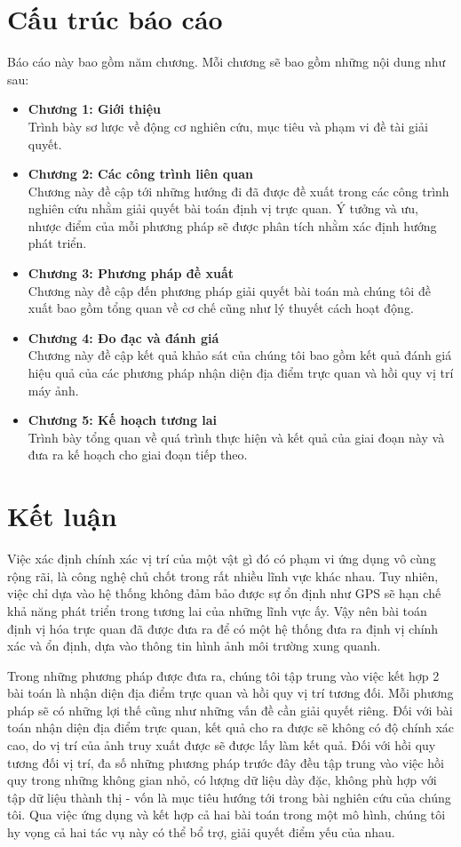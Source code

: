 \section{Cấu trúc báo cáo}
Báo cáo này bao gồm năm chương. Mỗi chương sẽ bao gồm những nội dung như sau:
\begin{itemize}
    \item \textbf{Chương 1: Giới thiệu} \\
          Trình bày sơ lược về động cơ nghiên cứu, mục tiêu và phạm vi đề tài giải quyết.
    \item \textbf{Chương 2: Các công trình liên quan} \\
          Chương này đề cập tới những hướng đi đã được đề xuất trong các công trình nghiên cứu nhằm giải quyết bài toán định vị trực quan. Ý tưởng và ưu, nhược điểm của mỗi phương pháp sẽ được phân tích nhằm xác định hướng phát triển.
    \item \textbf{Chương 3: Phương pháp đề xuất} \\
          Chương này đề cập đến phương pháp giải quyết bài toán mà chúng tôi đề xuất bao gồm tổng quan về cơ chế cũng như lý thuyết cách hoạt động.
    \item \textbf{Chương 4: Đo đạc và đánh giá} \\
          Chương này đề cập kết quả khảo sát của chúng tôi bao gồm kết quả đánh giá hiệu quả của các phương pháp nhận diện địa điểm trực quan và hồi quy vị trí máy ảnh.
    \item \textbf{Chương 5: Kế hoạch tương lai} \\
          Trình bày tổng quan về quá trình thực hiện và kết quả của giai đoạn này và đưa ra kế hoạch cho giai đoạn tiếp theo.
\end{itemize}
\newpage
\section{Kết luận}
Việc xác định chính xác vị trí của một vật gì đó có phạm vi ứng dụng vô cùng rộng rãi, là công nghệ chủ chốt trong rất nhiều lĩnh vực khác nhau. Tuy nhiên, việc chỉ dựa vào hệ thống không đảm bảo được sự ổn định như GPS sẽ hạn chế khả năng phát triển trong tương lai của những lĩnh vực ấy. Vậy nên bài toán định vị hóa trực quan đã được đưa ra để có một hệ thống đưa ra định vị chính xác và ổn định, dựa vào thông tin hình ảnh môi trường xung quanh.

Trong những phương pháp được đưa ra, chúng tôi tập trung vào việc kết hợp 2 bài toán là nhận diện địa điểm trực quan và hồi quy vị trí tương đối. Mỗi phương pháp sẽ có những lợi thế cũng như những vấn đề cần giải quyết riêng. Đối với bài toán nhận diện địa điểm trực quan, kết quả cho ra được sẽ không có độ chính xác cao, do vị trí của ảnh truy xuất được sẽ được lấy làm kết quả. Đối với hồi quy tương đối vị trí, đa số những phương pháp trước đây đều tập trung vào việc hồi quy trong những không gian nhỏ, có lượng dữ liệu dày đặc, không phù hợp với tập dữ liệu thành thị - vốn là mục tiêu hướng tới trong bài nghiên cứu của chúng tôi. Qua việc ứng dụng và kết hợp cả hai bài toán trong một mô hình, chúng tôi hy vọng cả hai tác vụ này có thể bổ trợ, giải quyết điểm yếu của nhau.

